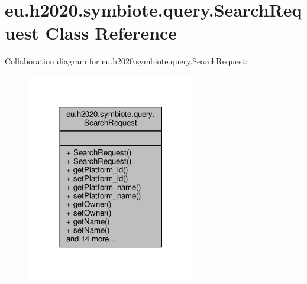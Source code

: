 \hypertarget{classeu_1_1h2020_1_1symbiote_1_1query_1_1SearchRequest}{}\section{eu.\+h2020.\+symbiote.\+query.\+Search\+Request Class Reference}
\label{classeu_1_1h2020_1_1symbiote_1_1query_1_1SearchRequest}


Collaboration diagram for eu.\+h2020.\+symbiote.\+query.\+Search\+Request\+:
\nopagebreak
\begin{figure}[H]
\begin{center}
\leavevmode
\includegraphics[width=209pt]{classeu_1_1h2020_1_1symbiote_1_1query_1_1SearchRequest__coll__graph}
\end{center}
\end{figure}
